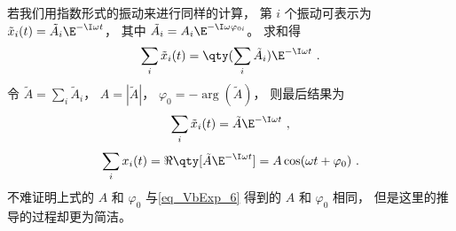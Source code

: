 若我们用指数形式的振动来进行同样的计算， 第 $i$ 个振动可表示为 $\tilde x_i(t) = \tilde A_i \E^{-\I\omega t}$， 其中 $\tilde A_i = A_i\E^{-\I\omega\varphi_{0i}}$。 求和得
\begin{equation}
\sum_i \tilde x_i(t) = \qty(\sum_i \tilde A_i ) \E^{-\I\omega t}~.
\end{equation}
令 $\tilde A = \sum_i \tilde A_i$， $A = |\tilde A|$， $\varphi_0 = -\arg(\tilde A)$， 则最后结果为
\begin{equation}
\sum_i \tilde x_i(t) = \tilde A \E^{-\I\omega t}~,
\end{equation}
\begin{equation}
\sum_i x_i(t) = \Re \qty[\tilde A \E^{-\I\omega t}] = A \cos(\omega t + \varphi_0)~.
\end{equation}
不难证明上式的 $A$ 和 $\varphi_0$ 与\autoref{eq_VbExp_6} 得到的 $A$ 和 $\varphi_0$ 相同， 但是这里的推导的过程却更为简洁。
